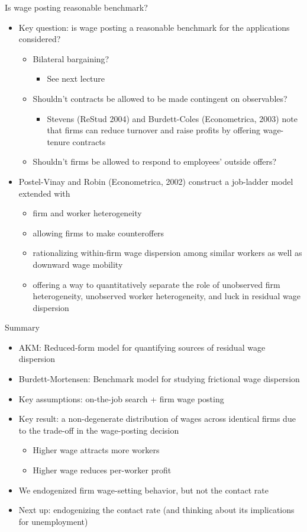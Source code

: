 \documentclass[9pt]{beamer}
\newcommand{\bit}{\begin{itemize}}
\newcommand{\eit}{\end{itemize}}
\begin{document}
\begin{frame}{Is wage posting reasonable benchmark?}

\bit
\setlength\itemsep{1.5em}

\item Key question: is wage posting a reasonable benchmark for the applications considered?
\bit	
\setlength\itemsep{0.5em}
\item Bilateral bargaining?
\bit
	\item See next lecture
\eit

\item Shouldn't contracts be allowed to be made contingent on observables?
\bit
	\item Stevens (ReStud 2004) and Burdett-Coles (Econometrica, 2003) note that firms can reduce turnover and raise profits by offering wage-tenure contracts
\eit

\item Shouldn't firms be allowed to respond to employees' outside offers?
\eit

\item Postel-Vinay and Robin (Econometrica, 2002) construct a job-ladder model extended with
\bit
	\setlength\itemsep{0.5em}
	\item firm and worker heterogeneity
	\item allowing firms to make counteroffers
	\item rationalizing within-firm wage dispersion among similar workers as well as downward wage mobility
	\item offering a way to quantitatively separate the role of unobserved firm heterogeneity, unobserved worker heterogeneity, and luck in residual wage dispersion
\eit
\eit

\end{frame}


\begin{frame}{Summary}

\bit
\setlength\itemsep{1.5em}

\item AKM: Reduced-form model for quantifying sources of residual wage dispersion

\item Burdett-Mortensen: Benchmark model for studying frictional wage dispersion

\item Key assumptions: on-the-job search + firm wage posting

\item Key result: a non-degenerate distribution of wages across identical firms due to the trade-off in the wage-posting decision
\bit
\item Higher wage attracts more workers
\item Higher wage reduces per-worker profit
\eit

\item We endogenized firm wage-setting behavior, but not the contact rate

\item Next up: endogenizing the contact rate (and thinking about its implications for unemployment)

\eit


\end{frame}
\end{document}
